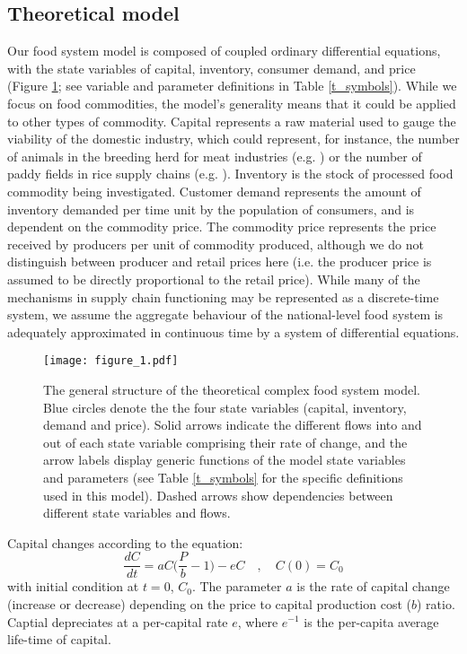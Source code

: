 \documentclass[12pt]{article}
\begin{document}
\subsection{Theoretical model}
Our food system model is composed of coupled ordinary differential equations, with the state variables of capital, inventory, consumer demand, and price (Figure \ref{fig_cfs}; see variable and parameter definitions in Table \ref{t_symbols}). While we focus on food commodities, the model's generality means that it could be applied to other types of commodity. Capital represents a raw material used to gauge the viability of the domestic industry, which could represent, for instance, the number of animals in the breeding herd for meat industries (e.g. \cite{meadows1971}) or the number of paddy fields in rice supply chains (e.g. \cite{chung2018}). Inventory is the stock of processed food commodity being investigated. Customer demand represents the amount of inventory demanded per time unit by the population of consumers, and is dependent on the commodity price. The commodity price represents the price received by producers per unit of commodity produced, although we do not distinguish between producer and retail prices here (i.e. the producer price is assumed to be directly proportional to the retail price). While many of the mechanisms in supply chain functioning may be represented as a discrete-time system, we assume the aggregate behaviour of the national-level food system is adequately approximated in continuous time by a system of differential equations.

\begin{figure}[t!]
  \centering
  \texttt{[image: figure\_1.pdf]}
  \caption{The general structure of the theoretical complex food system model. Blue circles denote the the four state variables (capital, inventory, demand and price). Solid arrows indicate the different flows into and out of each state variable comprising their rate of change, and the arrow labels display generic functions of the model state variables and parameters (see Table \ref{t_symbols} for the specific definitions used in this model). Dashed arrows show dependencies between different state variables and flows.}
  \label{fig_cfs}
\end{figure}

Capital changes according to the equation:
%
\begin{equation}
  \frac{dC}{dt} = a C \Big(\frac{P}{b} - 1\Big) - e C \quad, \quad C(0) = C_0
  \label{eq_capital}
\end{equation}
%
with initial condition at $t = 0$, $C_0$. The parameter $a$ is the rate of capital change (increase or decrease) depending on the price to capital production cost ($b$) ratio. Captial depreciates at a per-capital rate $e$, where $e^{-1}$ is the per-capita average life-time of capital.
\end{document}
